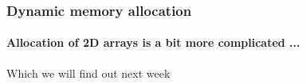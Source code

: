 \documentclass[10pt]{beamer}
\begin{document}
\begin{frame}[fragile]
  \frametitle{Dynamic memory allocation}
  \framesubtitle{Allocation of 2D arrays is a bit more complicated ...}
		Which we will find out next week
\end{frame}
\end{document}

